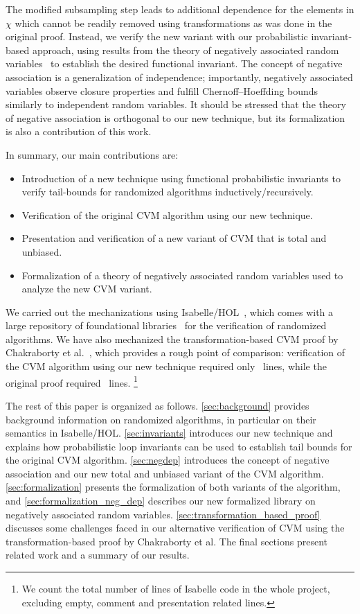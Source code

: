 The modified subsampling step leads to additional dependence for the elements in $\chi$ which cannot be readily removed using transformations as was done in the original proof.
Instead, we verify the new variant with our probabilistic invariant-based approach, using results from the theory of negatively associated random variables~\cite{joagdev1983} to establish the desired functional invariant.
The concept of negative association is a generalization of independence; importantly, negatively associated variables observe closure properties and fulfill Chernoff--Hoeffding bounds similarly to independent random variables.
It should be stressed that the theory of negative association is orthogonal to our new technique, but its formalization is also a contribution of this work.

In summary, our main contributions are:
\begin{itemize}
\item Introduction of a new technique using functional probabilistic invariants to verify tail-bounds for randomized algorithms inductively/recursively.
\item Verification of the original CVM algorithm using our new technique.
\item Presentation and verification of a new variant of CVM that is total and unbiased.
\item Formalization of a theory of negatively associated random variables used to analyze the new CVM variant.
\end{itemize}

We carried out the mechanizations using Isabelle/HOL~\cite{nipkow2002}, which comes with a large repository of foundational libraries~\cite{afp} for the verification of randomized algorithms.
We have also mechanized the transformation-based CVM proof by Chakraborty et al.~\cite{chakraborty2022,chakraborty2023}, which provides a rough point of comparison:
verification of the CVM algorithm using our new technique required only \locnew~lines, while the original proof required \locold~lines.
\footnote{
  We count the total number of lines of Isabelle code in the whole project, excluding empty, comment and presentation related lines.
}

The rest of this paper is organized as follows.
\cref{sec:background} provides background information on randomized algorithms, in particular on their semantics in Isabelle/HOL.
\cref{sec:invariants} introduces our new technique and explains how probabilistic loop invariants can be used to establish tail bounds for the original CVM algorithm.
\cref{sec:negdep} introduces the concept of negative association and our new total and unbiased variant of the CVM algorithm.
\cref{sec:formalization} presents the formalization of both variants of the algorithm, and \cref{sec:formalization_neg_dep} describes our new formalized library on negatively associated random variables.
\cref{sec:transformation_based_proof} discusses some challenges faced in our alternative verification of CVM using the transformation-based proof by Chakraborty et al.
The final sections present related work and a summary of our results.

